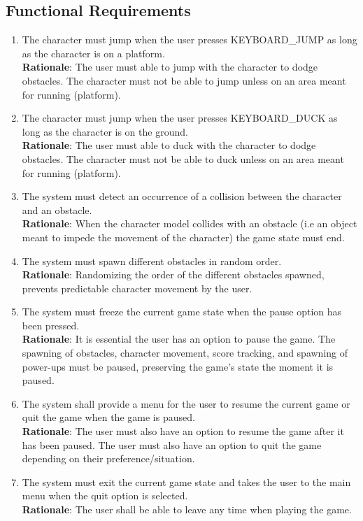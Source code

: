 \documentclass[12pt, titlepage]{article}
\begin{document}
\subsection{Functional Requirements}
\begin{enumerate}
	\item The character must jump when the user presses KEYBOARD\_JUMP as long as the character is on a platform.\\
	\textbf{Rationale}: The user must able to jump with the character to dodge obstacles. The character must not be able to jump unless on an area meant for running (platform).
	\item The character must jump when the user presses KEYBOARD\_DUCK as long as the character is on the ground.\\
	\textbf{Rationale}: The user must able to duck with the character to dodge obstacles. The character must not be able to duck unless on an area meant for running (platform).
	\item The system must detect an occurrence of a collision between the character and an obstacle.\\
	\textbf{Rationale}: When the character model collides with an obstacle (i.e an object meant to impede the movement of the character) the game state must end.
	\item The system must spawn different obstacles in random order.\\
	\textbf{Rationale}: Randomizing the order of the different obstacles spawned, prevents predictable character movement by the user.
	
	\item The system must freeze the current game state when the pause option has been pressed.\\
	\textbf{Rationale}: It is essential the user has an option to pause the game. The spawning of obstacles, character movement, score tracking, and spawning of power-ups must be paused, preserving the game's state the moment it is paused.
	
	\item The system shall provide a menu for the user to resume the current game or quit the game when the game is paused.\\
	\textbf{Rationale}: The user must also have an option to resume the game after it has been paused. The user must also have an option to quit the game depending on their preference/situation. 
	
	\item The system must exit the current game state and takes the user to the main menu when the quit option is selected.\\
	\textbf{Rationale}: The user shall be able to leave any time when playing the game.
	

\end{enumerate}
\end{document}
